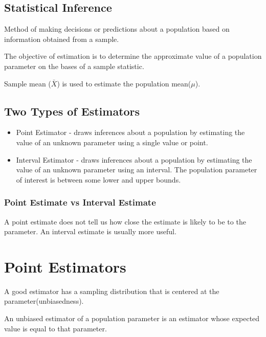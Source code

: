 \documentclass{article}
\begin{document}
    \subsection*{Statistical Inference}
    Method of making decisions or predictions about a population 
    based on information obtained from a sample.\par

    The objective of estimation is to determine the approximate value
    of a population parameter on the bases of a sample statistic.\par

    Sample mean ($\bar{X}$) is used to estimate the population mean($\mu$).\par

    \subsection*{Two Types of Estimators}
        \begin{itemize}  
            \item Point Estimator - draws inferences about a population 
                                    by estimating the value of an unknown parameter using a single value
                                    or point.
            \item Interval Estimator - draws inferences about a population
                                    by estimating the value of an unknown parameter using an interval.
                                    The population parameter of interest is between some lower and upper bounds.
        \end{itemize}

        \subsubsection*{Point Estimate vs Interval Estimate}
        A point estimate does not tell us how close the estimate is likely to be to the parameter.
        An interval estimate is usually more useful. 

    \section*{Point Estimators}
    A good estimator has a sampling distribution that
    is centered at the parameter(unbiasedness).\par

    An unbiased estimator of a population parameter is an estimator
    whose expected value is equal to that parameter.\par
\end{document}

